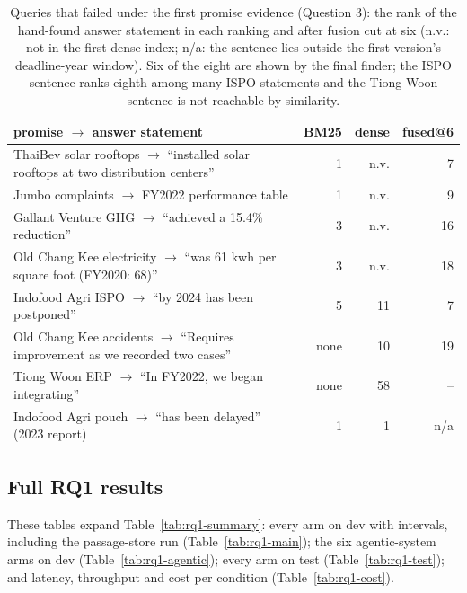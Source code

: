 \documentclass[11pt]{article}
\begin{document}
\begin{table}[!htbp]
\centering\footnotesize
\setlength{\tabcolsep}{3pt}
\begin{tabular*}{\linewidth}{@{}@{\extracolsep{\fill}}L{10.5cm}rrr@{}}
\toprule
promise $\to$ answer statement & BM25 & dense & fused@6 \\
\midrule
ThaiBev solar rooftops $\to$ ``installed solar rooftops at two distribution centers'' & 1 & n.v. & 7 \\
Jumbo complaints $\to$ FY2022 performance table & 1 & n.v. & 9 \\
Gallant Venture GHG $\to$ ``achieved a 15.4\% reduction'' & 3 & n.v. & 16 \\
Old Chang Kee electricity $\to$ ``was 61 kwh per square foot (FY2020: 68)'' & 3 & n.v. & 18 \\
Indofood Agri ISPO $\to$ ``by 2024 has been postponed'' & 5 & 11 & 7 \\
Old Chang Kee accidents $\to$ ``Requires improvement as we recorded two cases'' & none & 10 & 19 \\
Tiong Woon ERP $\to$ ``In FY2022, we began integrating'' & none & 58 & -- \\
Indofood Agri pouch $\to$ ``has been delayed'' (2023 report) & 1 & 1 & n/a \\
\bottomrule
\end{tabular*}
\caption{Queries that failed under the first promise evidence (Question 3): the rank of the hand-found answer statement in each ranking and after fusion cut at six (n.v.: not in the first dense index; n/a: the sentence lies outside the first version's deadline-year window). Six of the eight are shown by the final finder; the ISPO sentence ranks eighth among many ISPO statements and the Tiong Woon sentence is not reachable by similarity.}
\label{tab:fixed-queries}
\end{table}

\FloatBarrier

\subsection{Full RQ1 results}
\label{app:rq1}
These tables expand Table~\ref{tab:rq1-summary}: every arm on dev with intervals, including the passage-store run (Table~\ref{tab:rq1-main}); the six agentic-system arms on dev (Table~\ref{tab:rq1-agentic}); every arm on test (Table~\ref{tab:rq1-test}); and latency, throughput and cost per condition (Table~\ref{tab:rq1-cost}).
\end{document}
